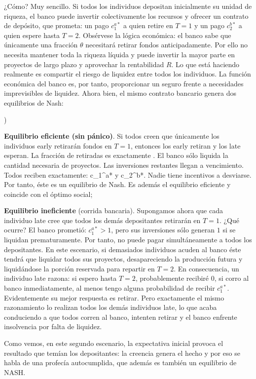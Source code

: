 \documentclass[10pt,a4paper]{article}
\newcounter{alphaitem}
\newenvironment{la}
      {\begin{list}{\alph{alphaitem})}{%
          \usecounter{alphaitem}%
          \setlength{\leftmargin}{1cm}%
          \setlength{\parskip}{3pt}%
          \setlength{\itemsep}{0pt}%
          \setlength{\parsep}{0pt}%
      }}
      {\end{list}}
\begin{document}
¿Cómo? Muy sencillo. Si todos los individuos depositan inicialmente su unidad de riqueza, el banco puede invertir colectivamente los recursos y ofrecer un contrato de depósito, que prometa: un pago $c_1^{a*}$ a quien retire en $T=1$ y un pago $c_2^{b*}$ a quien espere hasta $T=2$. Obsérvese la lógica económica: el banco sabe que únicamente una fracción $\theta$ necesitará retirar fondos anticipadamente. Por ello no necesita mantener toda la riqueza líquida y puede invertir la mayor parte en proyectos de largo plazo y aprovechar la rentabilidad $R$. Lo que está haciendo realmente es compartir el riesgo de liquidez entre todos los individuos. La función económica del banco es, por tanto, proporcionar un seguro frente a necesidades imprevisibles de liquidez. Ahora bien, el mismo contrato bancario genera dos equilibrios de Nash:
\begin{la}
    \item \textbf{Equilibrio eficiente (sin pánico)}. Si todos creen que únicamente los individuos early retirarán fondos en $T=1$, entonces los early retiran y los late esperan. La fracción de retiradas es exactamente \theta. El banco sólo liquida la cantidad necesaria de proyectos. Las inversiones restantes llegan a vencimiento. Todos reciben exactamente: c_1^{a*} y c_2^{b*}. Nadie tiene incentivos a desviarse. Por tanto, éste es un equilibrio de Nash. Es además el equilibrio eficiente y coincide con el óptimo social;
    \item \textbf{Equilibrio ineficiente} (corrida bancaria). Supongamos ahora que cada individuo late cree que todos los demás depositantes retirarán en $T=1$. ¿Qué ocurre? El banco prometió: $c_1^{a*}>1$, pero sus inversiones sólo generan $1$ si se liquidan prematuramente. Por tanto, no puede pagar simultáneamente a todos los depositantes. En este escenario, si demasiados individuos acuden al banco éste tendrá que liquidar todos sus proyectos, desapareciendo la producción futura y liquidándose la porción reservada para repartir en $T=2$. En consecuencia, un individuo late razona: si espero hasta $T=2$, probablemente recibiré $0$, si corro al banco inmediatamente, al menos tengo alguna probabilidad de recibir $c_1^{a*}$. Evidentemente su mejor respuesta es retirar. Pero exactamente el mismo razonamiento lo realizan todos los demás individuos late, lo que acaba conduciendo a que todos corren al banco, intenten retirar y el banco enfrente insolvencia por falta de liquidez.
\end{la}

Como vemos, en este segundo escenario, la expectativa inicial provoca el resultado que temían los depositantes: la creencia genera el hecho y por eso se habla de una profecía autocumplida, que además es también un equilibrio de NASH.
\end{document}
